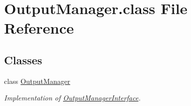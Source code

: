 \hypertarget{OutputManager_8class}{\section{Output\-Manager.\-class File Reference}
\label{OutputManager_8class}
}
\subsection*{Classes}
\begin{DoxyCompactItemize}
\item 
class \hyperlink{classOutputManager}{Output\-Manager}
\begin{DoxyCompactList}\small\item\em Implementation of \hyperlink{interfaceOutputManagerInterface}{Output\-Manager\-Interface}. \end{DoxyCompactList}\end{DoxyCompactItemize}
